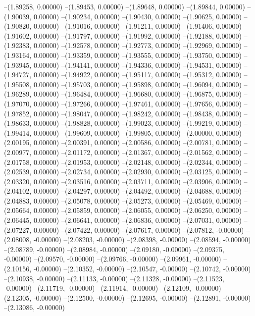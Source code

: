 --(1.89258, 0.00000)
--(1.89453, 0.00000)
--(1.89648, 0.00000)
--(1.89844, 0.00000)
--(1.90039, 0.00000)
--(1.90234, 0.00000)
--(1.90430, 0.00000)
--(1.90625, 0.00000)
--(1.90820, 0.00000)
--(1.91016, 0.00000)
--(1.91211, 0.00000)
--(1.91406, 0.00000)
--(1.91602, 0.00000)
--(1.91797, 0.00000)
--(1.91992, 0.00000)
--(1.92188, 0.00000)
--(1.92383, 0.00000)
--(1.92578, 0.00000)
--(1.92773, 0.00000)
--(1.92969, 0.00000)
--(1.93164, 0.00000)
--(1.93359, 0.00000)
--(1.93555, 0.00000)
--(1.93750, 0.00000)
--(1.93945, 0.00000)
--(1.94141, 0.00000)
--(1.94336, 0.00000)
--(1.94531, 0.00000)
--(1.94727, 0.00000)
--(1.94922, 0.00000)
--(1.95117, 0.00000)
--(1.95312, 0.00000)
--(1.95508, 0.00000)
--(1.95703, 0.00000)
--(1.95898, 0.00000)
--(1.96094, 0.00000)
--(1.96289, 0.00000)
--(1.96484, 0.00000)
--(1.96680, 0.00000)
--(1.96875, 0.00000)
--(1.97070, 0.00000)
--(1.97266, 0.00000)
--(1.97461, 0.00000)
--(1.97656, 0.00000)
--(1.97852, 0.00000)
--(1.98047, 0.00000)
--(1.98242, 0.00000)
--(1.98438, 0.00000)
--(1.98633, 0.00000)
--(1.98828, 0.00000)
--(1.99023, 0.00000)
--(1.99219, 0.00000)
--(1.99414, 0.00000)
--(1.99609, 0.00000)
--(1.99805, 0.00000)
--(2.00000, 0.00000)
--(2.00195, 0.00000)
--(2.00391, 0.00000)
--(2.00586, 0.00000)
--(2.00781, 0.00000)
--(2.00977, 0.00000)
--(2.01172, 0.00000)
--(2.01367, 0.00000)
--(2.01562, 0.00000)
--(2.01758, 0.00000)
--(2.01953, 0.00000)
--(2.02148, 0.00000)
--(2.02344, 0.00000)
--(2.02539, 0.00000)
--(2.02734, 0.00000)
--(2.02930, 0.00000)
--(2.03125, 0.00000)
--(2.03320, 0.00000)
--(2.03516, 0.00000)
--(2.03711, 0.00000)
--(2.03906, 0.00000)
--(2.04102, 0.00000)
--(2.04297, 0.00000)
--(2.04492, 0.00000)
--(2.04688, 0.00000)
--(2.04883, 0.00000)
--(2.05078, 0.00000)
--(2.05273, 0.00000)
--(2.05469, 0.00000)
--(2.05664, 0.00000)
--(2.05859, 0.00000)
--(2.06055, 0.00000)
--(2.06250, 0.00000)
--(2.06445, 0.00000)
--(2.06641, 0.00000)
--(2.06836, 0.00000)
--(2.07031, 0.00000)
--(2.07227, 0.00000)
--(2.07422, 0.00000)
--(2.07617, 0.00000)
--(2.07812, -0.00000)
--(2.08008, -0.00000)
--(2.08203, -0.00000)
--(2.08398, -0.00000)
--(2.08594, -0.00000)
--(2.08789, -0.00000)
--(2.08984, -0.00000)
--(2.09180, -0.00000)
--(2.09375, -0.00000)
--(2.09570, -0.00000)
--(2.09766, -0.00000)
--(2.09961, -0.00000)
--(2.10156, -0.00000)
--(2.10352, -0.00000)
--(2.10547, -0.00000)
--(2.10742, -0.00000)
--(2.10938, -0.00000)
--(2.11133, -0.00000)
--(2.11328, -0.00000)
--(2.11523, -0.00000)
--(2.11719, -0.00000)
--(2.11914, -0.00000)
--(2.12109, -0.00000)
--(2.12305, -0.00000)
--(2.12500, -0.00000)
--(2.12695, -0.00000)
--(2.12891, -0.00000)
--(2.13086, -0.00000)
